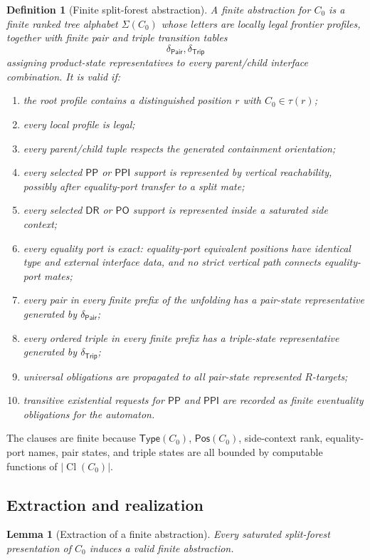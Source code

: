 \documentclass[11pt]{article}
\newtheorem{lemma}[theorem]{Lemma}
\newtheorem{definition}[theorem]{Definition}
\newcommand{\PP}{\mathsf{PP}}
\newcommand{\PPI}{\mathsf{PPI}}
\newcommand{\PO}{\mathsf{PO}}
\newcommand{\DR}{\mathsf{DR}}
\newcommand{\Cl}{\operatorname{Cl}}
\newcommand{\Typ}{\mathsf{Type}}
\newcommand{\Pos}{\mathsf{Pos}}
\newcommand{\Pair}{\mathsf{Pair}}
\newcommand{\Trip}{\mathsf{Trip}}
\begin{document}
\begin{definition}[Finite split-forest abstraction]
A finite abstraction for $C_0$ is a finite ranked tree alphabet $\Sigma(C_0)$ whose letters are locally legal frontier profiles, together with finite pair and triple transition tables
\[
  \delta_{\Pair},\delta_{\Trip}
\]
assigning product-state representatives to every parent/child interface combination.  It is valid if:
\begin{enumerate}[label=(A\arabic*)]
\item the root profile contains a distinguished position $r$ with $C_0\in\tau(r)$;
\item every local profile is legal;
\item every parent/child tuple respects the generated containment orientation;
\item every selected $\PP$ or $\PPI$ support is represented by vertical reachability, possibly after equality-port transfer to a split mate;
\item every selected $\DR$ or $\PO$ support is represented inside a saturated side context;
\item every equality port is exact: equality-port equivalent positions have identical type and external interface data, and no strict vertical path connects equality-port mates;
\item every pair in every finite prefix of the unfolding has a pair-state representative generated by $\delta_{\Pair}$;
\item every ordered triple in every finite prefix has a triple-state representative generated by $\delta_{\Trip}$;
\item universal obligations are propagated to all pair-state represented $R$-targets;
\item transitive existential requests for $\PP$ and $\PPI$ are recorded as finite eventuality obligations for the automaton.
\end{enumerate}
\end{definition}

The clauses are finite because $\Typ(C_0)$, $\Pos(C_0)$, side-context rank, equality-port names, pair states, and triple states are all bounded by computable functions of $|\Cl(C_0)|$.

\subsection{Extraction and realization}

\begin{lemma}[Extraction of a finite abstraction]
Every saturated split-forest presentation of $C_0$ induces a valid finite abstraction.
\end{lemma}
\end{document}
